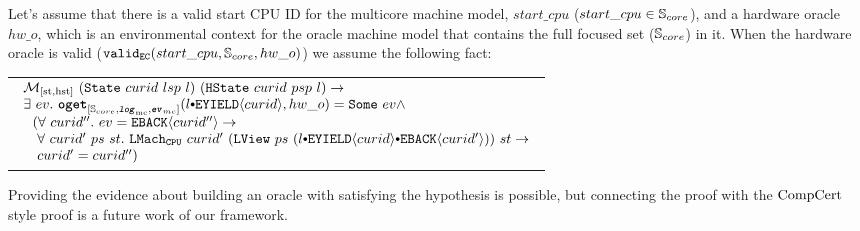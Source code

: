 \begin{hypothesis}
\label{hypo:chapter:conlink:mc-hw-refines-oracle-hypo}
Let's assume that there is a valid start CPU ID for the multicore machine model, 
$start\_cpu$ ($start\_cpu \in {\mathbb{S}_{core}}$), and a hardware oracle $hw\_o$,  
which is an environmental context for the oracle machine model that contains the full focused set (${\mathbb{S}_{core}}$) in it.
When the hardware oracle is valid ($ {{\mathrm{\texttt{valid}}}_{{\mathrm{\texttt{EC}}}}}({start\_cpu}, {{\mathbb{S}_{core}}}, {hw\_o})$) we assume the following fact:
\begin{center}
\begin{tabular}{P{0.95\textwidth}}
$
\begin{array}{l}
\matchstatehstate{(\mcstate{curid}{lsp}{l})}{(\hstate{curid}{psp}{l})} \rightarrow \\
\exists\ ev .\ \oget{\coreset}{\mclog}{\mcevent}{\listconsoppo{\yieldev{curid}}{l}}{hw\_o}{ev} \wedge \\
\ \ (\forall \ curid'' . \ ev = \yieldbackev{curid''} \rightarrow\\
 \ \ \  \forall \ curid' \ ps \ st .\  \hardwarelocalstep{curid'}{(\localview{ps}{(\listconsoppo{\yieldbackev{curid'}}{\listconsoppo{\yieldev{curid}}{l}})})}{st} \rightarrow \\
 \ \  \ curid' = curid'') \\
\end{array}
$
\end{tabular}
\end{center}
\end{hypothesis}

Providing the evidence about building an oracle with satisfying the hypothesis is possible, 
but connecting the proof with the $\mathrm{CompCert}$ style proof is a future work of our framework. 


